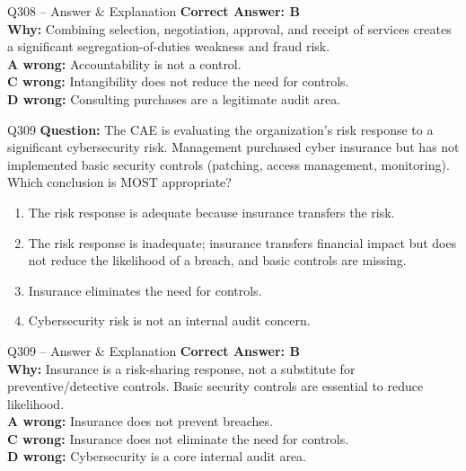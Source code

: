 \documentclass[aspectratio=169,10pt]{beamer}
\begin{document}
	\begin{frame}[t]{Q308 -- Answer \& Explanation}
		\small
		\textbf{Correct Answer: B} \\[4pt]
		\textbf{Why:} Combining selection, negotiation, approval, and receipt of services creates a significant segregation-of-duties weakness and fraud risk. \\[4pt]
		\textbf{A wrong:} Accountability is not a control. \\[2pt]
		\textbf{C wrong:} Intangibility does not reduce the need for controls. \\[2pt]
		\textbf{D wrong:} Consulting purchases are a legitimate audit area.
	\end{frame}
	
	\begin{frame}[t]{Q309}
		\small
		\textbf{Question:} The CAE is evaluating the organization's risk response to a significant cybersecurity risk. Management purchased cyber insurance but has not implemented basic security controls (patching, access management, monitoring). Which conclusion is MOST appropriate?
		\begin{enumerate}[label=\Alph*.,itemsep=1pt,topsep=2pt]
			\item The risk response is adequate because insurance transfers the risk.
			\item The risk response is inadequate; insurance transfers financial impact but does not reduce the likelihood of a breach, and basic controls are missing.
			\item Insurance eliminates the need for controls.
			\item Cybersecurity risk is not an internal audit concern.
		\end{enumerate}
	\end{frame}
	
	\begin{frame}[t]{Q309 -- Answer \& Explanation}
		\small
		\textbf{Correct Answer: B} \\[4pt]
		\textbf{Why:} Insurance is a risk-sharing response, not a substitute for preventive/detective controls. Basic security controls are essential to reduce likelihood. \\[4pt]
		\textbf{A wrong:} Insurance does not prevent breaches. \\[2pt]
		\textbf{C wrong:} Insurance does not eliminate the need for controls. \\[2pt]
		\textbf{D wrong:} Cybersecurity is a core internal audit area.
	\end{frame}
	
\end{document}

